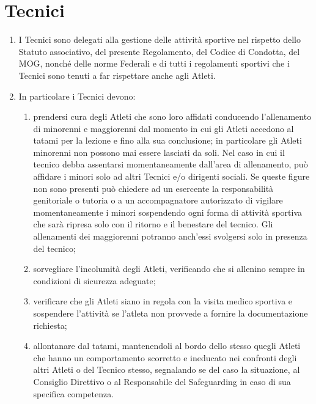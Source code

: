 \documentclass{djtsdoc}
\begin{document}
	\section{Tecnici}
	\begin{enumerate}
		\item I Tecnici sono delegati alla gestione delle attività sportive nel rispetto dello Statuto associativo, del presente Regolamento, del Codice di Condotta, del MOG, nonché delle norme Federali e di tutti i regolamenti sportivi che i Tecnici sono tenuti a far rispettare anche agli Atleti.
		\item In particolare i Tecnici devono:
		\begin{enumerate}
			\item prendersi cura degli Atleti che sono loro affidati conducendo l'allenamento di minorenni e maggiorenni dal momento in cui gli Atleti accedono al tatami per la lezione e fino alla sua conclusione; in particolare gli Atleti minorenni non possono mai essere lasciati da soli. Nel caso in cui il tecnico debba assentarsi momentaneamente dall'area di allenamento, può affidare i minori solo ad altri Tecnici e/o dirigenti sociali. Se queste figure non sono presenti può chiedere ad un esercente la responsabilità genitoriale o tutoria o a un accompagnatore autorizzato di vigilare momentaneamente i minori sospendendo ogni forma di attività sportiva che sarà ripresa solo con il ritorno e il benestare del tecnico. Gli allenamenti dei maggiorenni potranno anch'essi svolgersi solo in presenza del tecnico;
			\item sorvegliare l'incolumità degli Atleti, verificando che si allenino sempre in condizioni di sicurezza adeguate;
			\item verificare che gli Atleti siano in regola con la visita medico sportiva e sospendere l'attività se l'atleta non provvede a fornire la documentazione richiesta;
			\item allontanare dal tatami, mantenendoli al bordo dello stesso quegli Atleti che hanno un comportamento scorretto e ineducato nei confronti degli altri Atleti o del Tecnico stesso, segnalando se del caso la situazione, al Consiglio Direttivo o al Responsabile del Safeguarding in caso di sua specifica competenza.
		\end{enumerate}
	\end{enumerate}
	
\end{document}
